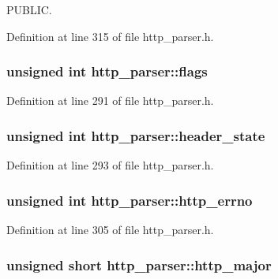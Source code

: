 P\-U\-B\-L\-I\-C. 



Definition at line 315 of file http\-\_\-parser.\-h.

\hypertarget{structhttp__parser_a5e54708e0cb3f9ced19bd829dcdeaf53}{
\subsubsection[{flags}]{\setlength{\rightskip}{0pt plus 5cm}unsigned int http\-\_\-parser\-::flags}}\label{structhttp__parser_a5e54708e0cb3f9ced19bd829dcdeaf53}


Definition at line 291 of file http\-\_\-parser.\-h.

\hypertarget{structhttp__parser_ac5b254b99c6472ca19ae1f426758ce75}{
\subsubsection[{header\-\_\-state}]{\setlength{\rightskip}{0pt plus 5cm}unsigned int http\-\_\-parser\-::header\-\_\-state}}\label{structhttp__parser_ac5b254b99c6472ca19ae1f426758ce75}


Definition at line 293 of file http\-\_\-parser.\-h.

\hypertarget{structhttp__parser_ab8638d65fa174bc1925d77e2533117fa}{
\subsubsection[{http\-\_\-errno}]{\setlength{\rightskip}{0pt plus 5cm}unsigned int http\-\_\-parser\-::http\-\_\-errno}}\label{structhttp__parser_ab8638d65fa174bc1925d77e2533117fa}


Definition at line 305 of file http\-\_\-parser.\-h.

\hypertarget{structhttp__parser_ac994a4a8268652f5ce82de5bde5c3f9d}{
\subsubsection[{http\-\_\-major}]{\setlength{\rightskip}{0pt plus 5cm}unsigned short http\-\_\-parser\-::http\-\_\-major}}\label{structhttp__parser_ac994a4a8268652f5ce82de5bde5c3f9d}


